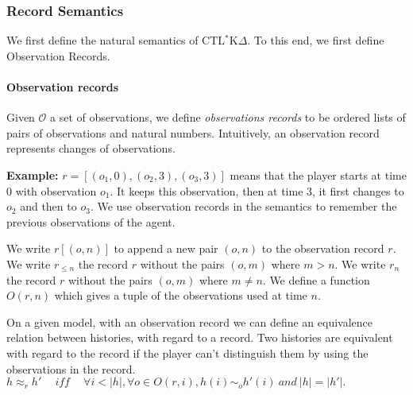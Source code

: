 \documentclass[dvipsnames]{acmart}
\def\ctlskd{CTL$^{*}$K$\Delta$}
\def\eqh#1{\approx_{#1}}
\def\eqstate#1{\sim_{#1}}
\def\iff{\ \mathit{iff}\ }
\begin{document}
\subsubsection{Record Semantics}
We first define the natural semantics of \ctlskd. To this end, we first define Observation Records.

\paragraph{Observation records}
Given $\mathcal{O}$ a set of observations, we define \textit{observations records} to be ordered lists of pairs of observations and natural numbers.
Intuitively, an observation record represents changes of observations.

\textbf{Example:}  $r=[(o_1,0),(o_2,3),(o_3,3)]$ means that the player starts at time 0 with observation $o_1$. It keeps this observation, then at time 3, it first changes to $o_2$ and then to $o_3$. We use observation records in the semantics to remember the previous observations of the agent.

We write $r[(o,n)]$ to append a new pair $(o,n)$ to the observation record $r$.
We write $r_{\leq n}$ the record $r$ without the pairs $(o,m)$ where $m>n$.
We write $r_n$ the record $r$ without the pairs $(o,m)$ where $m\neq n$. 
We define a function $\mathit{O}(r,n)$ which gives a tuple of the observations used at time $n$. 

On a given model, with an observation record we can define an equivalence relation between histories, with regard to a record. Two histories are equivalent with regard to the record if the player can't distinguish them by using the observations in the record.\\
$h\eqh{r}h'\quad\iff\quad \forall i< |h|, \forall o\in \mathit{O}(r,i), h(i)\eqstate{o} h'(i)~\textit{and}~|h|=|h'|.$
\end{document}

